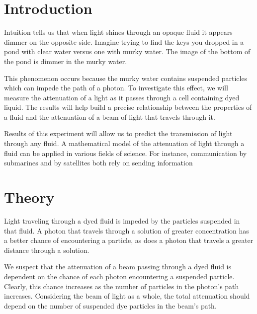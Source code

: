 \documentclass[aps,prl,reprint,groupedaddress,amsmath,amssymb,aps]{revtex4-1}
\begin{document}
	\maketitle
	

	\section{\label{sec:level1}Introduction}
	Intuition tells us that when light shines through an opaque fluid it appears dimmer on the opposite side. Imagine trying to find the keys you dropped in a pond with clear water versus one with murky water. The image of the bottom of the pond is dimmer in the murky water. 
	
	This phenomenon occurs because the murky water contains suspended particles which can impede the path of a photon. To investigate this effect, we will measure the attenuation of a light as it passes through a cell containing dyed liquid. The results will help build a precise relationship between the properties of a fluid and the attenuation of a beam of light that travels through it.
	
	Results of this experiment will allow us to predict the transmission of light through any fluid. A mathematical model of the attenuation of light through a fluid can be applied in various fields of science. For instance, communication by submarines and by satellites both rely on sending information
	
	\section{Theory}
	Light traveling through a dyed fluid is impeded by the particles suspended in that fluid. A photon that travels through a solution of greater concentration has a better chance of encountering a particle, as does a photon that travels a greater distance through a solution.
	
	We suspect that the attenuation of a beam passing through a dyed fluid is dependent on the chance of each photon encountering a suspended particle. Clearly, this chance increases as the number of particles in the photon's path increases. Considering the beam of light as a whole, the total attenuation should depend on the number of suspended dye particles in the beam's path.
	
\end{document}
